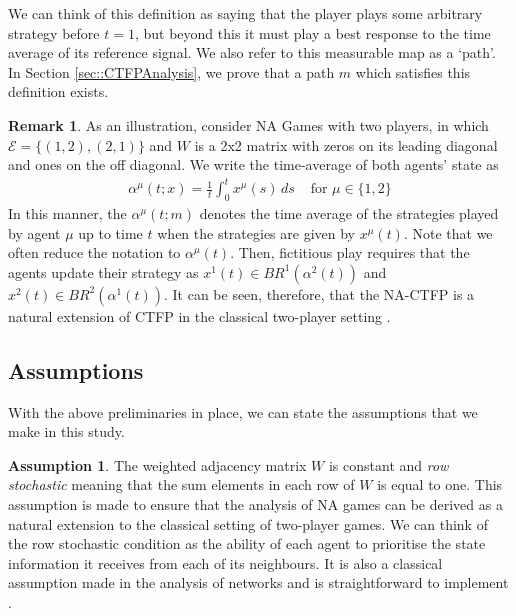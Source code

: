 \documentclass{article}
\theoremstyle{definition}
\newtheorem{assumption}{Assumption}
\newtheorem*{remark}{Remark}
\newcommand{\edgeset}{\mathcal{E}}
\newcommand{\weightset}{W}
\newcommand{\xmu}{x^{\mu}}
\begin{document}
  We can think of this definition as saying that the player plays some arbitrary strategy before
  $t = 1$, but beyond this it must play a best response to the time average of its reference
  signal. We also refer to this measurable map as a `path'. In Section \ref{sec::CTFPAnalysis}, we prove that a path $m$ which satisfies this definition exists.
  
  \begin{remark}
    As an illustration, consider NA Games with two players, in which $\edgeset = \{(1, 2),
    (2, 1)\}$ and $\weightset$ is a 2x2 matrix with zeros on its leading diagonal and ones on
    the off diagonal. We write the time-average of both agents' state as
    \begin{align*}
      \alpha^\mu(t; x) = \frac{1}{t} \int_0^t \xmu(s) \, ds & \text{ for $\mu \in \{1, 2\}$}
    \end{align*}
    In this manner, the $\alpha^\mu(t; m)$ denotes the time average of the strategies played by
    agent $\mu$ up to time $t$ when the strategies are given by $\xmu(t)$. Note that we often reduce the notation to $\alpha^\mu(t)$. Then, fictitious play requires that the agents update their
    strategy as $x^1(t) \in BR^1(\alpha^2(t))$ and $x^2(t) \in BR^2(\alpha^1(t))$. It can be
    seen, therefore, that the NA-CTFP is a natural extension of CTFP in the classical
    two-player setting \cite{Hofbauer2006}.
  \end{remark}

\subsection{Assumptions}

  With the above preliminaries in place, we can state the assumptions that we make in this study.

  \begin{assumption}\label{ass::rowstochastic}
    The weighted adjacency matrix $\weightset$ is constant and
    \emph{row stochastic} meaning that the sum elements in each row of
    $\weightset$ is equal to one. This assumption is made to ensure
    that the analysis of NA games can be derived as a natural
    extension to the classical setting of two-player games. We can
    think of the row stochastic condition as the ability of each agent
    to prioritise the state information it receives from each of its
    neighbours. It is also a classical assumption made in the analysis
    of networks and is straightforward to implement \cite{Mai2019}.
  \end{assumption}
\end{document}
